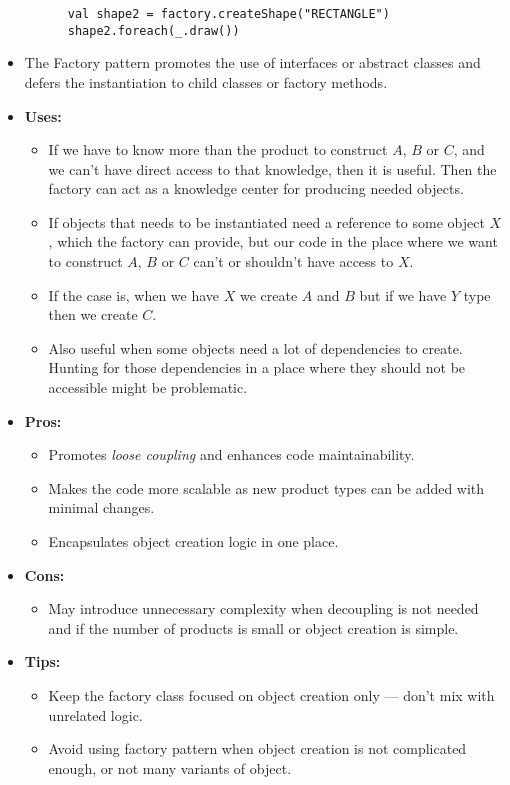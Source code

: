 \documentclass{article}
\begin{document}
\begin{itemize}
\begin{verbatim}
      val shape2 = factory.createShape("RECTANGLE")
      shape2.foreach(_.draw())
          \end{verbatim}
    \item The Factory pattern promotes the use of interfaces or abstract classes and defers the instantiation to child classes or factory methods.
    \item \textbf{Uses:}
    \begin{itemize}
      \item If we have to know more than the product to construct \(A\), \(B\) or \(C\), and we can't have direct access to that knowledge, then it is useful. Then the factory can act as a knowledge center for producing needed objects.
      \item If objects that needs to be instantiated need a reference to some object \(X\), which the factory can provide, but our code in the place where we want to construct \(A\), \(B\) or \(C\) can't or shouldn't have access to \(X\).
      \item If the case is, when we have \(X\) we create \(A\) and \(B\) but if we have \(Y\) type then we create \(C\).
      \item Also useful when some objects need a lot of dependencies to create. Hunting for those dependencies in a place where they should not be accessible might be problematic.
    \end{itemize}
    \item \textbf{Pros:}
    \begin{itemize}
          \item Promotes \textit{loose coupling} and enhances code maintainability.
          \item Makes the code more scalable as new product types can be added with minimal changes.
          \item Encapsulates object creation logic in one place.
    \end{itemize}
    \item \textbf{Cons:}
    \begin{itemize}
          \item May introduce unnecessary complexity when decoupling is not needed and if the number of products is small or object creation is simple.
    \end{itemize}
    \item \textbf{Tips:}
    \begin{itemize}
          \item Keep the factory class focused on object creation only — don't mix with unrelated logic.
          \item Avoid using factory pattern when object creation is not complicated enough, or not many variants of object.
    \end{itemize}
\end{itemize}
\newpage
\printindex
\end{document}
